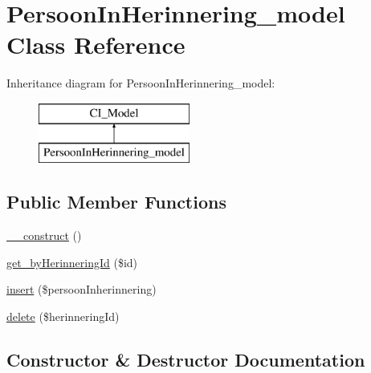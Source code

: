 \hypertarget{class_persoon_in_herinnering__model}{}\section{Persoon\+In\+Herinnering\+\_\+model Class Reference}
\label{class_persoon_in_herinnering__model}
Inheritance diagram for Persoon\+In\+Herinnering\+\_\+model\+:\begin{figure}[H]
\begin{center}
\leavevmode
\includegraphics[height=2.000000cm]{class_persoon_in_herinnering__model}
\end{center}
\end{figure}
\subsection*{Public Member Functions}
\begin{DoxyCompactItemize}
\item 
\mbox{\hyperlink{class_persoon_in_herinnering__model_a095c5d389db211932136b53f25f39685}{\+\_\+\+\_\+construct}} ()
\item 
\mbox{\hyperlink{class_persoon_in_herinnering__model_ae051e39373126f3d7e76165f5321b6f3}{get\+\_\+by\+Herinnering\+Id}} (\$id)
\item 
\mbox{\hyperlink{class_persoon_in_herinnering__model_a73e9de4fbc1e49790caee7218edb874a}{insert}} (\$persoon\+Inherinnering)
\item 
\mbox{\hyperlink{class_persoon_in_herinnering__model_aa4b59888d725b40a291f7e241fe60203}{delete}} (\$herinnering\+Id)
\end{DoxyCompactItemize}


\subsection{Constructor \& Destructor Documentation}
\mbox{\label{class_persoon_in_herinnering__model_a095c5d389db211932136b53f25f39685}} 
